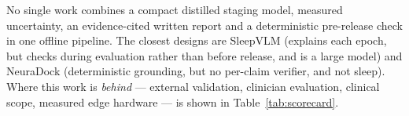 No single work combines a compact distilled staging model, measured uncertainty, an evidence-cited written report
and a deterministic pre-release check in one offline pipeline. The closest designs are SleepVLM (explains each
epoch, but checks during evaluation rather than before release, and is a large model) and NeuraDock (deterministic
grounding, but no per-claim verifier, and not sleep). Where this work is \emph{behind} --- external validation,
clinician evaluation, clinical scope, measured edge hardware --- is shown in Table~\ref{tab:scorecard}.
